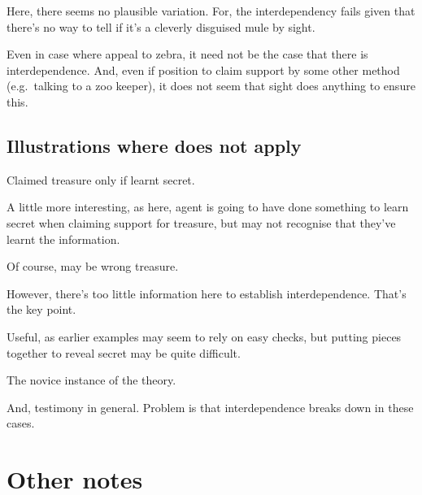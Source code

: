 \begin{note}
  Here, there seems no plausible variation.
  For, the interdependency fails given that there's no way to tell if it's a cleverly disguised mule by sight.

  Even in case where appeal to zebra, it need not be the case that there is interdependence.
  And, even if position to claim support by some other method (e.g.\ talking to a zoo keeper), it does not seem that sight does anything to ensure this.
\end{note}

\subsection{Illustrations where \nI{} does not apply}

\begin{note}
  \begin{illustration}
    Claimed treasure only if learnt secret.
  \end{illustration}
  A little more interesting, as here, agent is going to have done something to learn secret when claiming support for treasure, but may not recognise that they've learnt the information.

  Of course, may be wrong treasure.

  However, there's too little information here to establish interdependence.
  That's the key point.

  Useful, as earlier examples may seem to rely on easy checks, but putting pieces together to reveal secret may be quite difficult.
\end{note}

\begin{note}
  The novice instance of the theory.

  And, testimony in general.
  Problem is that interdependence breaks down in these cases.
\end{note}


\newpage

\section{Other notes}
\label{sec:other-notes}


